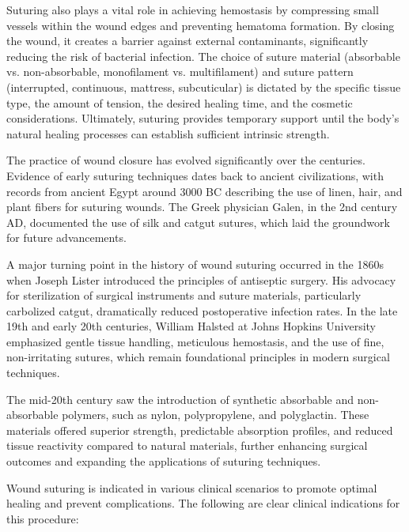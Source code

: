 Suturing also plays a vital role in achieving hemostasis by compressing small vessels within the wound edges and preventing hematoma formation. By closing the wound, it creates a barrier against external contaminants, significantly reducing the risk of bacterial infection. The choice of suture material (absorbable vs. non-absorbable, monofilament vs. multifilament) and suture pattern (interrupted, continuous, mattress, subcuticular) is dictated by the specific tissue type, the amount of tension, the desired healing time, and the cosmetic considerations. Ultimately, suturing provides temporary support until the body's natural healing processes can establish sufficient intrinsic strength.

The practice of wound closure has evolved significantly over the centuries. Evidence of early suturing techniques dates back to ancient civilizations, with records from ancient Egypt around 3000 BC describing the use of linen, hair, and plant fibers for suturing wounds. The Greek physician Galen, in the 2nd century AD, documented the use of silk and catgut sutures, which laid the groundwork for future advancements.

A major turning point in the history of wound suturing occurred in the 1860s when Joseph Lister introduced the principles of antiseptic surgery. His advocacy for sterilization of surgical instruments and suture materials, particularly carbolized catgut, dramatically reduced postoperative infection rates. In the late 19th and early 20th centuries, William Halsted at Johns Hopkins University emphasized gentle tissue handling, meticulous hemostasis, and the use of fine, non-irritating sutures, which remain foundational principles in modern surgical techniques.

The mid-20th century saw the introduction of synthetic absorbable and non-absorbable polymers, such as nylon, polypropylene, and polyglactin. These materials offered superior strength, predictable absorption profiles, and reduced tissue reactivity compared to natural materials, further enhancing surgical outcomes and expanding the applications of suturing techniques.

Wound suturing is indicated in various clinical scenarios to promote optimal healing and prevent complications. The following are clear clinical indications for this procedure:

